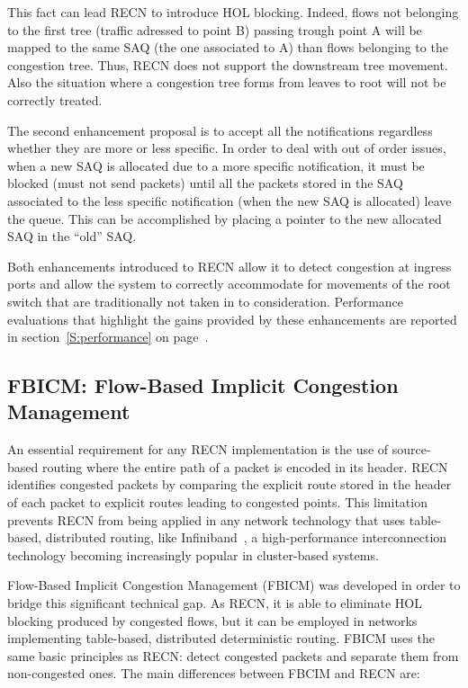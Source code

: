 \documentclass[12pt]{article}
\begin{document}
This fact can lead RECN to introduce HOL blocking. Indeed, flows not belonging to the first tree (traffic adressed to point B) passing trough point A will be mapped to the same SAQ (the one associated to A) than flows belonging to the congestion tree. Thus, RECN does not support the downstream tree movement. Also the situation where a congestion tree forms from leaves to root will not be correctly treated.

The second enhancement proposal is to accept all the notifications regardless whether they are more or less specific. In order to deal with out of order issues, when a new SAQ is allocated due to a more specific notification, it must be blocked (must not send packets) until all the packets stored in the SAQ associated to the less specific notification (when the new SAQ is allocated) leave the queue. This can be accomplished by placing a pointer to the new allocated SAQ in the “old” SAQ.

Both enhancements introduced to RECN allow it to detect congestion at ingress ports and allow the system to correctly accommodate for movements of the root switch that are traditionally not taken in to consideration. Performance evaluations that highlight the gains provided by these enhancements are reported in section~\ref{S:performance} on page~\pageref{S:performance}.

\subsection{FBICM: Flow-Based Implicit Congestion Management}\label{S:fbicm}

An essential requirement for any RECN implementation is the use of source-based routing where the entire path of a packet is encoded in its header. RECN identifies congested packets by comparing the explicit route stored in the header of each packet to explicit routes leading to congested points. This limitation prevents RECN from being applied in any network technology that uses table-based, distributed routing, like Infiniband~\cite{infiniband}, a high-performance interconnection technology becoming increasingly popular in cluster-based systems.

Flow-Based Implicit Congestion Management (FBICM) was developed in order to bridge this significant technical gap. As RECN, it is able to eliminate HOL blocking produced by congested flows, but it can be employed in networks implementing table-based, distributed deterministic routing. FBICM uses the same basic principles as RECN: detect congested packets and separate them from non-congested ones. The main differences between FBCIM and RECN are: 
\end{document}
